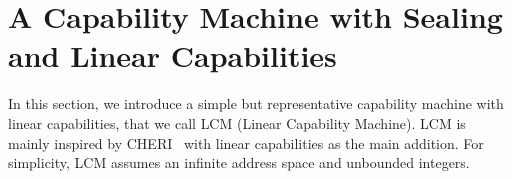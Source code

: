 \documentclass[acmsmall,review,showframe]{acmart}\settopmatter{printfolios=true,printccs=false,printacmref=false}
\newcommand{\trgcm}{\textsc{LCM}}
\begin{document}
\section{A Capability Machine with Sealing and Linear Capabilities}
\label{sec:cap-mach-w-seal-and-lin}
In this section, we introduce a simple but representative capability machine with linear capabilities, that we call \trgcm{} (Linear Capability Machine).
\trgcm{} is mainly inspired by CHERI~\citep{watson_cheri:_2015} with linear capabilities as the main addition.
For simplicity, \trgcm{} assumes an infinite address space and unbounded integers.
\end{document}
